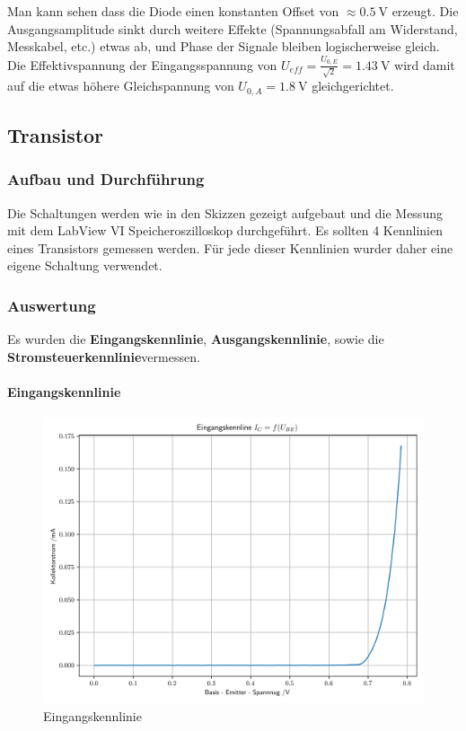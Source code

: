\documentclass[12pt,twoside,a4paper]{scrartcl}
\begin{document}
			Man kann sehen dass die Diode einen konstanten Offset von $\approx \SI{0.5}{\volt}$ erzeugt. Die Ausgangsamplitude sinkt durch weitere Effekte (Spannungsabfall am Widerstand, Messkabel, etc.) etwas ab, und Phase der Signale bleiben logischerweise gleich. Die Effektivspannung der Eingangsspannung von $U_{eff} = \frac{U_{0,E}}{\sqrt{2}} = \SI{1.43}{\volt}$ wird damit auf die etwas höhere Gleichspannung von $  U_{0,A} = \SI{1.8}{\volt}$ gleichgerichtet.


	\subsection{Transistor}
		\subsubsection{Aufbau und Durchführung}
			Die Schaltungen werden wie in den Skizzen gezeigt aufgebaut und die Messung mit dem LabView VI Speicheroszilloskop durchgeführt.
      Es sollten 4 Kennlinien eines Transistors gemessen werden. Für jede dieser Kennlinien wurder daher eine eigene Schaltung verwendet.

		\subsubsection{Auswertung}

        Es wurden die \textbf{Eingangskennlinie}, \textbf{Ausgangskennlinie}, sowie die \textbf{Stromsteuerkennlinie}vermessen.

        \paragraph{Eingangskennlinie}

            \begin{figure}[H]
                \centering
                \includegraphics[width = 0.9 \textwidth]{Plots/Transistor/Einganskennline}
                \caption{Eingangskennlinie}
            \end{figure}
\end{document}
